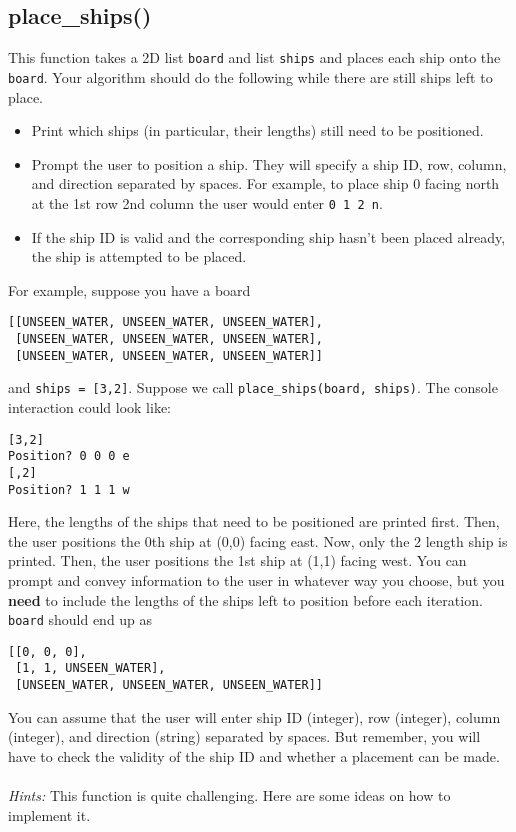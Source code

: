 \documentclass{article}
\begin{document}
\subsection{place\_ships()}
This function takes a 2D list \texttt{board} and list \texttt{ships} and places each ship onto the \texttt{board}. Your algorithm should do the following while there are still ships left to place.
\begin{itemize}
    \item Print which ships (in particular, their lengths) still need to be positioned. 
    \item Prompt the user to position a ship. They will specify a ship ID, row, column, and direction separated by spaces. For example, to place ship 0 facing north at the 1st row 2nd column the user would enter \texttt{0 1 2 n}.
    \item If the ship ID is valid and the corresponding ship hasn't been placed already, the ship is attempted to be placed. 
\end{itemize}
For example, suppose you have a board
\begin{verbatim}
[[UNSEEN_WATER, UNSEEN_WATER, UNSEEN_WATER], 
 [UNSEEN_WATER, UNSEEN_WATER, UNSEEN_WATER], 
 [UNSEEN_WATER, UNSEEN_WATER, UNSEEN_WATER]]
\end{verbatim}
and \texttt{ships = [3,2]}. Suppose we call \texttt{place\_ships(board, ships)}. The console interaction could look like:
\begin{verbatim}
[3,2]
Position? 0 0 0 e
[,2]
Position? 1 1 1 w
\end{verbatim}
Here, the lengths of the ships that need to be positioned are printed first. Then, the user positions the 0th ship at (0,0) facing east. Now, only the 2 length ship is printed. Then, the user positions the 1st ship at (1,1) facing west. You can prompt and convey information to the user in whatever way you choose, but you \textbf{need} to include the lengths of the ships left to position before each iteration. \texttt{board} should end up as
\begin{verbatim}
[[0, 0, 0], 
 [1, 1, UNSEEN_WATER], 
 [UNSEEN_WATER, UNSEEN_WATER, UNSEEN_WATER]]
\end{verbatim}
You can assume that the user will enter ship ID (integer), row (integer), column (integer), and direction (string) separated by spaces. But remember, you will have to check the validity of the ship ID and whether a placement can be made.\\\\
\textit{Hints:} This function is quite challenging. Here are some ideas on how to implement it.
\end{document}

